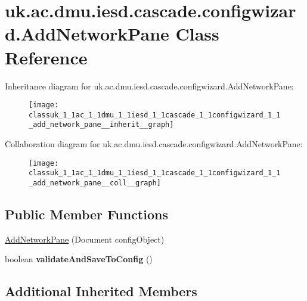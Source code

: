\hypertarget{classuk_1_1ac_1_1dmu_1_1iesd_1_1cascade_1_1configwizard_1_1_add_network_pane}{\section{uk.\-ac.\-dmu.\-iesd.\-cascade.\-configwizard.\-Add\-Network\-Pane Class Reference}
\label{classuk_1_1ac_1_1dmu_1_1iesd_1_1cascade_1_1configwizard_1_1_add_network_pane}
}


Inheritance diagram for uk.\-ac.\-dmu.\-iesd.\-cascade.\-configwizard.\-Add\-Network\-Pane\-:\nopagebreak
\begin{figure}[H]
\begin{center}
\leavevmode
\texttt{[image: classuk\_1\_1ac\_1\_1dmu\_1\_1iesd\_1\_1cascade\_1\_1configwizard\_1\_1\_add\_network\_pane\_\_inherit\_\_graph]}
\end{center}
\end{figure}


Collaboration diagram for uk.\-ac.\-dmu.\-iesd.\-cascade.\-configwizard.\-Add\-Network\-Pane\-:\nopagebreak
\begin{figure}[H]
\begin{center}
\leavevmode
\texttt{[image: classuk\_1\_1ac\_1\_1dmu\_1\_1iesd\_1\_1cascade\_1\_1configwizard\_1\_1\_add\_network\_pane\_\_coll\_\_graph]}
\end{center}
\end{figure}
\subsection*{Public Member Functions}
\begin{DoxyCompactItemize}
\item 
\hyperlink{classuk_1_1ac_1_1dmu_1_1iesd_1_1cascade_1_1configwizard_1_1_add_network_pane_a8b732e2ee41e638421868b4682785b0c}{Add\-Network\-Pane} (Document config\-Object)
\item 
\hypertarget{classuk_1_1ac_1_1dmu_1_1iesd_1_1cascade_1_1configwizard_1_1_add_network_pane_a396eb16261f46a5df1a1d760df405dc2}{boolean {\bfseries validate\-And\-Save\-To\-Config} ()}\label{classuk_1_1ac_1_1dmu_1_1iesd_1_1cascade_1_1configwizard_1_1_add_network_pane_a396eb16261f46a5df1a1d760df405dc2}

\end{DoxyCompactItemize}
\subsection*{Additional Inherited Members}


